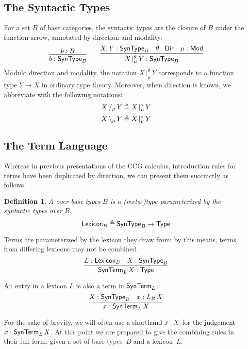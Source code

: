 \documentclass{amsart}
\newtheorem{definition}[theorem]{Definition}
\begin{document}
\def\arrty#1|[#2,#3]#4{#1\,|^{#2}_{#3}\,#4}
\def\rarrty#1|[#2]#3{#1\,/_{#2}\,#3}
\def\larrty#1|[#2]#3{#1\,\backslash_#2\,#3}


\subsection{The Syntactic Types}
For a set $B$ of base categories, the syntactic types are the closure
of $B$ under the function arrow, annotated by direction and
modality:
\[
  \infer{b : \ty{SynType}_B}
  {
    b : B
  }
  \qquad
  \infer{\arrty X|[\theta,\mu]Y : \ty{SynType}_B}
  {
    X, Y : \ty{SynType}_B &
    \theta : \ty{Dir} &
    \mu : \ty{Mod}
  }
\]
Modulo direction and modality, the notation $\arrty X|[\theta,\mu]Y$
corresponds to a function type $Y\to X$ in ordinary type theory.
Moreover, when direction is known, we abbreviate with the
following notations:
\begin{align*}
  \rarrty X|[\mu]Y &\triangleq \arrty X|[\con\triangleright,\mu]Y\\
  \larrty X|[\mu]Y &\triangleq \arrty X|[\con\triangleleft,\mu]Y
\end{align*}


\subsection{The Term Language}
Whereas in previous presentations of the CCG calculus, introduction
rules for terms have been duplicated by direction, we can present
them succinctly as follows.

\begin{definition}
  A  over base types $B$ is a (meta-)type parameterized by the
  syntactic types over $B$.
  \[ \mathsf{Lexicon}_B \triangleq \mathsf{SynType}_B\to\mathsf{Type} \]
\end{definition}

Terms are parameterized by the lexicon they draw from: by this means,
terms from differing lexicons may not be combined.
\[
  \infer{\ty{SynTerm}_L\, X : \ty{Type}}
  {
    L : \ty{Lexicon}_B &
    X : \ty{SynType}_B
  }
\]

An entry in a lexicon $L$ is also a term in $\mathsf{SynTerm}_L$.
\[
  \infer{x : \ty{SynTerm}_L\,X}
  {
    X : \ty{SynType}_B &
    x : L_B\, X
  }
\]

\def\syn#1:#2{#1 \mathbin{{\bf\color{blue}:}} #2}

For the sake of brevity, we will often use a shorthand $x\syn:X$ for the
judgement $x:\mathsf{SynTerm}_L\,X$. At this point we are prepared to give
the combining rules in their full form; given a set of base types~$B$
and a lexicon~$L$:
\end{document}
